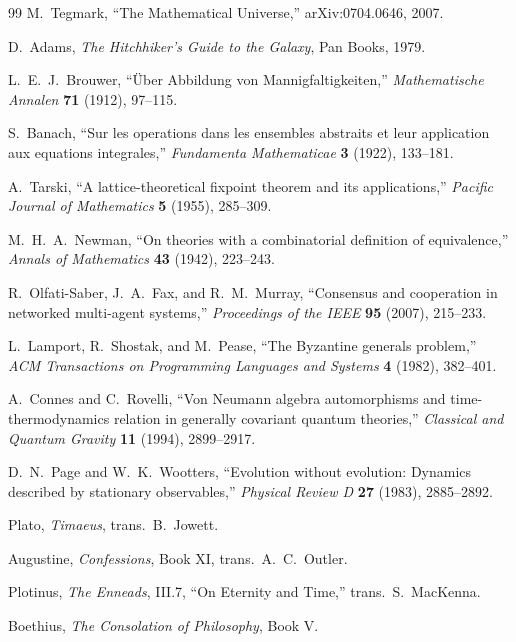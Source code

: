 \documentclass[11pt]{article}
\theoremstyle{remark}
\theoremstyle{plain}
\begin{document}
\begin{thebibliography}{99}
M.\ Tegmark,
``The Mathematical Universe,''
arXiv:0704.0646, 2007.

D.\ Adams,
\emph{The Hitchhiker's Guide to the Galaxy},
Pan Books, 1979.

L.\ E.\ J.\ Brouwer,
``\"Uber Abbildung von Mannigfaltigkeiten,''
\emph{Mathematische Annalen} \textbf{71} (1912), 97--115.

S.\ Banach,
``Sur les operations dans les ensembles abstraits et leur application aux equations integrales,''
\emph{Fundamenta Mathematicae} \textbf{3} (1922), 133--181.

A.\ Tarski,
``A lattice-theoretical fixpoint theorem and its applications,''
\emph{Pacific Journal of Mathematics} \textbf{5} (1955), 285--309.

M.\ H.\ A.\ Newman,
``On theories with a combinatorial definition of equivalence,''
\emph{Annals of Mathematics} \textbf{43} (1942), 223--243.

R.\ Olfati-Saber, J.\ A.\ Fax, and R.\ M.\ Murray,
``Consensus and cooperation in networked multi-agent systems,''
\emph{Proceedings of the IEEE} \textbf{95} (2007), 215--233.

L.\ Lamport, R.\ Shostak, and M.\ Pease,
``The Byzantine generals problem,''
\emph{ACM Transactions on Programming Languages and Systems} \textbf{4} (1982), 382--401.

A.\ Connes and C.\ Rovelli,
``Von Neumann algebra automorphisms and time-thermodynamics relation in generally covariant quantum theories,''
\emph{Classical and Quantum Gravity} \textbf{11} (1994), 2899--2917.

D.\ N.\ Page and W.\ K.\ Wootters,
``Evolution without evolution: Dynamics described by stationary observables,''
\emph{Physical Review D} \textbf{27} (1983), 2885--2892.

Plato,
\emph{Timaeus},
trans.\ B.\ Jowett.

Augustine,
\emph{Confessions}, Book XI,
trans.\ A.\ C.\ Outler.

Plotinus,
\emph{The Enneads}, III.7, ``On Eternity and Time,''
trans.\ S.\ MacKenna.

Boethius,
\emph{The Consolation of Philosophy}, Book V.


\end{thebibliography}
\end{document}
